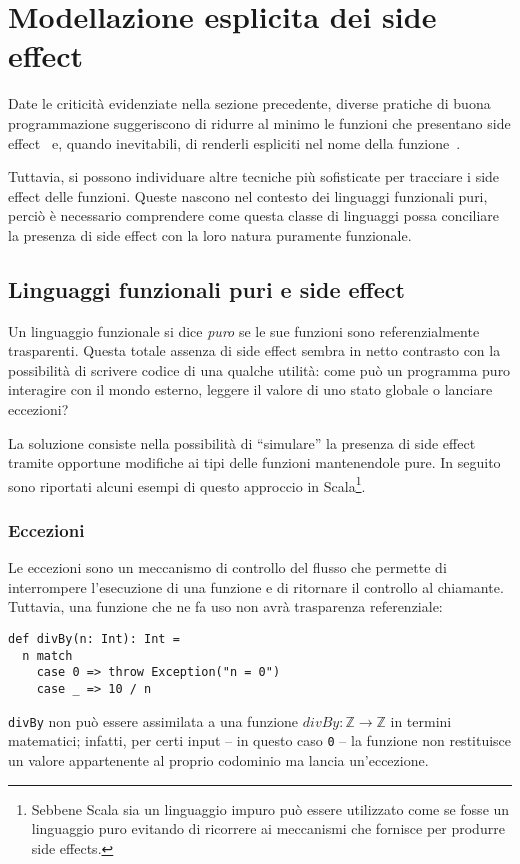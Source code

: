\section{Modellazione esplicita dei side effect}
\label{modellazione-esplicita-dei-side-effect}

Date le criticità evidenziate nella sezione precedente, diverse pratiche di buona programmazione suggeriscono di ridurre al minimo le funzioni che presentano side effect~\cite[p.~44]{cit:clean-code-a-handbook-of-agile-software-craftsmanship} e, quando inevitabili, di renderli espliciti nel nome della funzione~\cite[p.~313]{cit:clean-code-a-handbook-of-agile-software-craftsmanship}.

Tuttavia, si possono individuare altre tecniche più sofisticate per tracciare i side effect delle funzioni.
Queste nascono nel contesto dei linguaggi funzionali puri, perciò è necessario comprendere come questa classe di linguaggi possa conciliare la presenza di side effect con la loro natura puramente funzionale.

\subsection{Linguaggi funzionali puri e side effect}
\label{linguaggi-funzionali-puri-e-side-effect}
Un linguaggio funzionale si dice \emph{puro} se le sue funzioni sono referenzialmente trasparenti.
Questa totale assenza di side effect sembra in netto contrasto con la possibilità di scrivere codice di una qualche utilità: come può un programma puro interagire con il mondo esterno, leggere il valore di uno stato globale o lanciare eccezioni?

La soluzione consiste nella possibilità di ``simulare'' la presenza di side effect tramite opportune modifiche ai tipi delle funzioni mantenendole pure.
In seguito sono riportati alcuni esempi di questo approccio in Scala\footnote{Sebbene Scala sia un linguaggio impuro può essere utilizzato come se fosse un linguaggio puro evitando di ricorrere ai meccanismi che fornisce per produrre side effects.}.

\subsubsection{Eccezioni}
\label{eccezioni}
Le eccezioni sono un meccanismo di controllo del flusso che permette di interrompere l'esecuzione di una funzione e di ritornare il controllo al chiamante.
Tuttavia, una funzione che ne fa uso non avrà trasparenza referenziale:
\begin{lstlisting}[language=scala3]
def divBy(n: Int): Int =
  n match
    case 0 => throw Exception("n = 0")
    case _ => 10 / n
\end{lstlisting}
\lstinline|divBy| non può essere assimilata a una funzione $divBy : \mathbb{Z} \rightarrow \mathbb{Z}$ in termini matematici; infatti, per certi input -- in questo caso \lstinline|0| -- la funzione non restituisce un valore appartenente al proprio codominio ma lancia un'eccezione.

